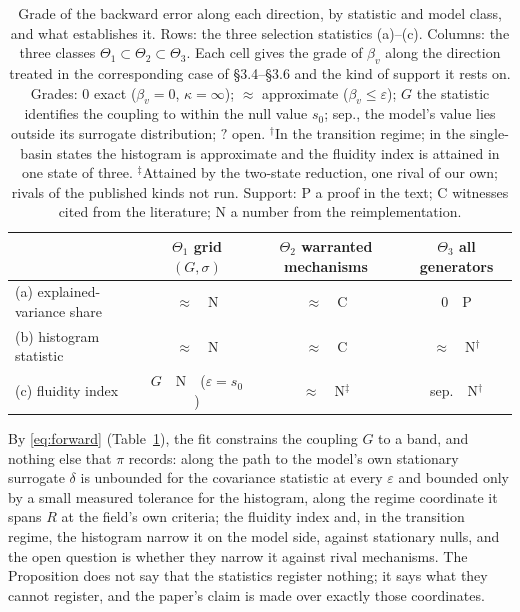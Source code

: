 \documentclass[11pt]{article}
\begin{document}
\begin{table}[htbp]\centering\small
\caption{Grade of the backward error along each direction, by statistic and model class, and what establishes it. Rows: the three selection statistics (a)--(c). Columns: the three classes $\Theta_1\subset\Theta_2\subset\Theta_3$. Each cell gives the grade of $\beta_v$ along the direction treated in the corresponding case of \S3.4--\S3.6 and the kind of support it rests on. Grades: $0$ exact ($\beta_v=0$, $\kappa=\infty$); $\approx$ approximate ($\beta_v\le\varepsilon$); $G$ the statistic identifies the coupling to within the null value $s_0$; sep., the model's value lies outside its surrogate distribution; $?$ open. $^{\dagger}$In the transition regime; in the single-basin states the histogram is approximate and the fluidity index is attained in one state of three. $^{\ddagger}$Attained by the two-state reduction, one rival of our own; rivals of the published kinds not run. Support: P a proof in the text; C witnesses cited from the literature; N a number from the reimplementation.}
\label{tab:grid}
\renewcommand{\arraystretch}{1.25}
\begin{tabular}{@{}l ccc@{}}
\toprule
 & $\Theta_1$ grid $(G,\sigma)$ & $\Theta_2$ warranted mechanisms & $\Theta_3$ all generators \\
\midrule
(a) explained-variance share & $\approx$\ \ N & $\approx$\ \ C & $0$\ \ P \\
(b) histogram statistic      & $\approx$\ \ N & $\approx$\ \ C & $\approx$\ \ N$^{\dagger}$ \\
(c) fluidity index           & $G$\ \ N\ \ ($\varepsilon=s_0$) & $\approx$\ \ N$^{\ddagger}$ & sep.\ \ N$^{\dagger}$ \\
\bottomrule
\end{tabular}
\end{table}

By \eqref{eq:forward} (Table~\ref{tab:grid}), the fit constrains the coupling $G$ to a band, and nothing else that $\pi$ records: along the path to the model's own stationary surrogate $\delta$ is unbounded for the covariance statistic at every $\varepsilon$ and bounded only by a small measured tolerance for the histogram, along the regime coordinate it spans $R$ at the field's own criteria; the fluidity index and, in the transition regime, the histogram narrow it on the model side, against stationary nulls, and the open question is whether they narrow it against rival mechanisms. The Proposition does not say that the statistics register nothing; it says what they cannot register, and the paper's claim is made over exactly those coordinates.
\end{document}
